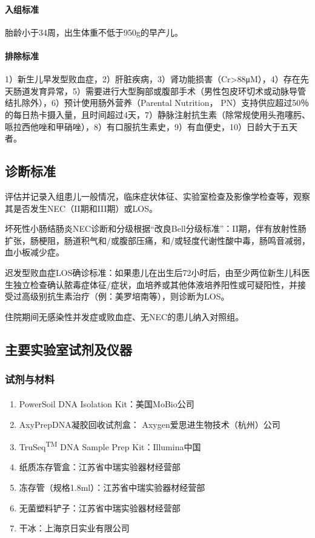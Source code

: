       \paragraph{入组标准}
      胎龄小于34周，出生体重不低于950g的早产儿。
      \paragraph{排除标准}
      1）新生儿早发型败血症，2）肝脏疾病，3）肾功能损害（Cr>88μM），4）存在先天肠道发育异常，5）需要进行大型胸部或腹部手术（男性包皮环切术或动脉导管结扎除外），6）预计使用肠外营养（Parental Nutrition， PN）支持供应超过50％的每日热卡摄入量，且时间超过4天，7）静脉注射抗生素（除常规使用头孢噻肟、哌拉西他唑和甲硝唑），8）有口服抗生素史，9）有血便史，10）日龄大于五天者。
  \subsection{诊断标准}
  评估并记录入组患儿一般情况，临床症状体征、实验室检查及影像学检查等，观察其是否发生NEC（II期和III期）或LOS。

  坏死性小肠结肠炎NEC诊断和分级根据“改良Bell分级标准”\cite{bell1978neonatal}：II期，伴有放射性肠扩张，肠梗阻，肠道积气和/或腹部压痛，和/或轻度代谢性酸中毒，肠鸣音减弱，血小板减少症。

  迟发型败血症LOS确诊标准：如果患儿在出生后72小时后，由至少两位新生儿科医生独立检查确认脓毒症体征/症状，血培养或其他体液培养阳性或可疑阳性，并接受过高级别抗生素治疗（例：美罗培南等），则诊断为LOS。

  住院期间无感染性并发症或败血症、无NEC的患儿纳入对照组。

  \subsection{主要实验室试剂及仪器}
  \label{主要实验室试剂及仪器}
    \subsubsection{试剂与材料}
    \begin{enumerate}
      \item PowerSoil\textsuperscript{\textregistered} DNA Isolation Kit：美国MoBio公司
      \item AxyPrepDNA凝胶回收试剂盒： Axygen爱思进生物技术（杭州）公司
      \item TruSeq\textsuperscript{TM} DNA Sample Prep Kit：Illumina中国
      \item 纸质冻存管盒：江苏省中瑞实验器材经营部
      \item 冻存管（规格1.8ml）：江苏省中瑞实验器材经营部
      \item 无菌塑料铲子：江苏省中瑞实验器材经营部
      \item 干冰：上海京日实业有限公司
    \end{enumerate}
